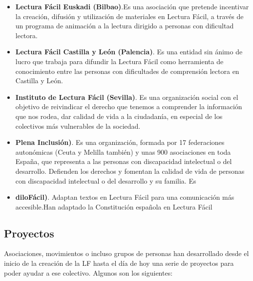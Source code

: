 \begin{itemize}
	\item{\textbf{Lectura Fácil Euskadi (Bilbao)}}\cite{LFEuskadi}.Es una asociación que pretende incentivar la creación, difusión y utilización de materiales en Lectura Fácil, a través de un programa de animación a la lectura dirigido a personas con dificultad lectora.
	
	\item{\textbf{Lectura Fácil Castilla y León (Palencia)}}\cite{LFCastillaLeon}. Es una entidad sin ánimo de lucro que trabaja para difundir la Lectura Fácil como herramienta de conocimiento entre las personas con dificultades de comprensión lectora en Castilla y León.
	
	\item{\textbf{Instituto de Lectura Fácil (Sevilla)}}\cite{LFInstitutoSevilla}. Es una organización social con el objetivo de reivindicar el derecho que tenemos a comprender la información que nos rodea, dar calidad de vida a la ciudadanía, en especial de los colectivos más vulnerables de la sociedad.
	
		\item{\textbf{Plena Inclusión)}}\cite{PlenaInclusion}. Es una organización, formada por 17 federaciones autonómicas (Ceuta y Melilla también) y unas 900 asociaciones en toda España, que representa a las personas con discapacidad intelectual o del desarrollo.	Defienden los derechos y fomentan la calidad de vida de personas con discapacidad intelectual o del desarrollo y su familia. Es
		
	\item{\textbf{diloFácil)}}\cite{DiloFacil}. Adaptan textos en Lectura Fácil para una comunicación más accesible.Han adaptado la Constitución española en Lectura Fácil
		
\end{itemize}

\subsection{Proyectos}
Asociaciones, movimientos o incluso grupos de personas han desarrollado desde el inicio de la creación de la LF hasta el día de hoy una serie de proyectos para poder ayudar a ese colectivo. Algunos son los siguientes:

